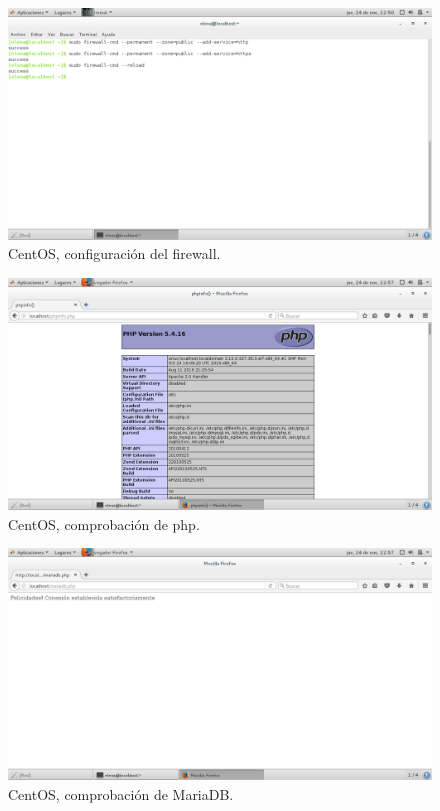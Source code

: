 \begin{figure}[H] 
	\centering
	\includegraphics[width=15cm]{./img/ejercicio9_7.png} 	
	\caption{CentOS, configuración del firewall.} \label{fig:ejercicio9_7}
\end{figure}

\begin{figure}[H] 
	\centering
	\includegraphics[width=15cm]{./img/ejercicio9_8.png} 	
	\caption{CentOS, comprobación de php.} \label{fig:ejercicio9_8}
\end{figure}

\begin{figure}[H] 
	\centering
	\includegraphics[width=15cm]{./img/ejercicio9_9.png} 	
	\caption{CentOS, comprobación de MariaDB.} \label{fig:ejercicio9_9}
\end{figure}




